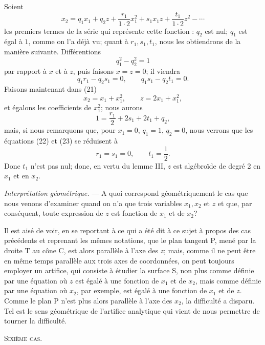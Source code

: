 \documentclass[11pt]{article}
\begin{document}
Soient
\begin{equation*}\tag{21}
x_2=q_1x_1+q_2z+\frac{r_1}{1\cdot2}x_1^2+s_1x_1z+\frac{t_1}{1\cdot2}z^2-\cdots
\end{equation*}
les premiers termes de la série qui représente cette fonction : $q_2$ est nul; $q_1$ est égal à $1$, comme on l’a déjà vu; quant à $r_1,s_1,t_1$, nous les obtiendrons de la manière suivante. Différentions
\[
q_1^2-q_2^2=1
\]
par rapport à $x$ et à $z$, puis faisons $x=z=0$; il viendra
\begin{equation*}\tag{22}
q_1r_1-q_2s_1=0,\qquad q_1s_1-q_2t_1=0.
\end{equation*}
Faisons maintenant dans (21)
\[
x_2=x_1+x_1^2,\qquad z=2x_1+x_1^2,
\]
et égalons les coefficients de $x_1^2$; nous aurons
\begin{equation*}\tag{23}
1=\frac{r_1}{2}+2s_1+2t_1+q_2,
\end{equation*}
mais, si nous remarquons que, pour $x_1=0$, $q_1=1$, $q_2=0$, nous verrons que les équations (22) et (23) se réduisent à
\[
r_1=s_1=0,\qquad t_1=\frac{1}{2}.
\]
Donc $t_1$ n’est pas nul; donc, en vertu du lemme III, $z$ est algébroïde de degré 2 en $x_1$ et en $x_2$.

\emph{Interprétation géométrique.} — A quoi correspond géométriquement le cas que nous venons d’examiner quand on n’a que trois variables $x_1,x_2$ et $z$ et que, par conséquent, toute expression de $z$ est fonction de $x_1$ et de $x_2$?

Il est aisé de voir, en se reportant à ce qui a été dit à ce sujet à propos des cas précédents et reprenant les mêmes notations, que le plan tangent P, mené par la droite T au cône C, est alors parallèle à l’axe des $z$; mais, comme il ne peut être en même temps parallèle aux trois axes de coordonnées, on peut toujours employer un artifice, qui consiste à étudier la surface S, non plus comme définie par une équation où $z$ est égalé à une fonction de $x_1$ et de $x_2$, mais comme définie par une équation où $x_2$, par exemple, est égalé à une fonction de $x_1$ et de $z$. Comme le plan P n’est plus alors parallèle à l’axe des $x_2$, la difficulté a disparu. Tel est le sens géométrique de l’artifice analytique qui vient de nous permettre de tourner la difficulté.

\begin{center}
{\scshape Sixième cas.}
\end{center}
\end{document}
